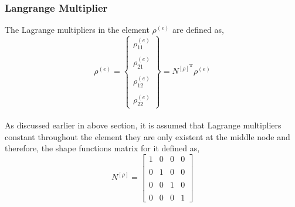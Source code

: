 \documentclass[12pt]{article}
\begin{document}
\subsubsection{ Langrange Multiplier}
The Lagrange multipliers in the element $ \rho^{(e)}$ are defined as,
\begin{equation}
\rho^{(e)}=
\begin{Bmatrix}
\rho_{11}^{(e)} \\
\\
\rho_{21}^{(e)} \\
\\
\rho_{12}^{(e)} \\
\\
\rho_{22}^{(e)}
\end{Bmatrix}
=N^{[\rho]^{\textbf{T}}}\rho^{(e)}
\end{equation}
\\
As discussed earlier in above section, it is assumed that  Lagrange multipliers constant throughout the element they are only existent at the middle node and therefore, the shape functions matrix for it defined as,
\begin{equation}
N^{[\rho]}=
\begin{bmatrix}
1&0&0&0 \\
\\
0&1&0&0 \\
\\
0&0&1&0 \\
\\
0&0&0&1
\end{bmatrix}
\end{equation}
\end{document}
